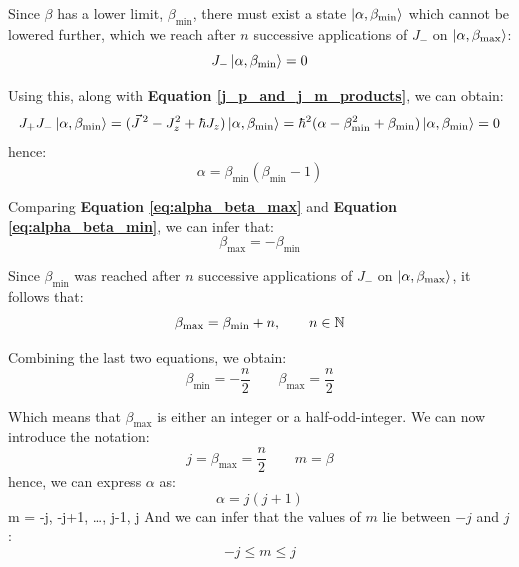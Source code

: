 Since $\beta$ has a lower limit, $\beta_\text{min}$, there must exist a state $\ket{\alpha, \beta_\text{min}}$ which cannot be lowered further, which we reach after $n$ successive applications of $J_-$ on $\ket{\alpha, \beta_\text{max}}$:
\begin{equation} \label{eq:alpha_beta_max}
    J_-\ket{\alpha, \beta_\text{min}} = 0
\end{equation}

Using this, along with \textbf{Equation \ref{j_p_and_j_m_products}}, we can obtain:
\begin{equation}
    J_+J_-\ket{\alpha,\beta_\text{min}} = (\vec{J}\,^2 - J_z^2 + \hbar J_z)\ket{\alpha,\beta_\text{min}} = \hbar^2(\alpha-\beta_\text{min}^2 + \beta_\text{min})\ket{\alpha,\beta_\text{min}} = 0
\end{equation}
hence:
\begin{equation} \label{eq:alpha_beta_min}
    \alpha = \beta_\text{min}(\beta_\text{min} - 1)
\end{equation}

Comparing \textbf{Equation \ref{eq:alpha_beta_max}} and \textbf{Equation \ref{eq:alpha_beta_min}}, we can infer that:
\begin{equation}
    \beta_\text{max} = -\beta_\text{min}
\end{equation}

Since $\beta_\text{min}$ was reached after $n$ successive applications of $J_-$ on $\ket{\alpha, \beta_\text{max}}$, it follows that:
\begin{equation}
    \beta_\text{max} = \beta_\text{min} + n, \qquad n\in \mathbb{N}
\end{equation}

Combining the last two equations, we obtain:
\begin{equation}
    \beta_\text{min} = -\frac{n}{2}\qquad \beta_\text{max} = \frac{n}{2}
\end{equation}

Which means that $\beta_\text{max}$ is either an integer or a half-odd-integer. We can now introduce the notation:
\begin{equation}
    j = \beta_\text{max} = \frac{n}{2}\qquad m = \beta
\end{equation}
hence, we can express $\alpha$ as:
\begin{equation}
    \alpha = j(j+1)
\end{equation}m = -j, -j+1, \dots, j-1, j
And we can infer that the values of $m$ lie between $-j$ and $j$:
\begin{equation}
    -j \leq m \leq j
\end{equation}

